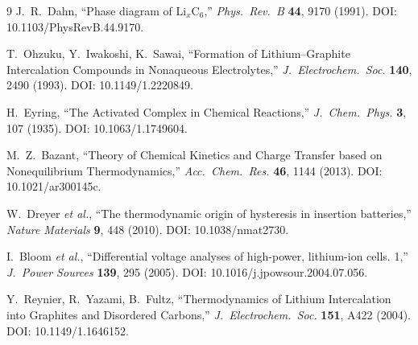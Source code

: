 \documentclass[11pt,a4paper]{article}
\begin{document}
\begin{thebibliography}{9}
J.~R.~Dahn, ``Phase diagram of $\mathrm{Li}_x\mathrm{C}_6$,''
\emph{Phys.\ Rev.\ B} \textbf{44}, 9170 (1991).
DOI: 10.1103/PhysRevB.44.9170.

T.~Ohzuku, Y.~Iwakoshi, K.~Sawai,
``Formation of Lithium--Graphite Intercalation Compounds in Nonaqueous Electrolytes,''
\emph{J.\ Electrochem.\ Soc.} \textbf{140}, 2490 (1993).
DOI: 10.1149/1.2220849.

H.~Eyring, ``The Activated Complex in Chemical Reactions,''
\emph{J.\ Chem.\ Phys.} \textbf{3}, 107 (1935).
DOI: 10.1063/1.1749604.

M.~Z.~Bazant,
``Theory of Chemical Kinetics and Charge Transfer based on Nonequilibrium Thermodynamics,''
\emph{Acc.\ Chem.\ Res.} \textbf{46}, 1144 (2013).
DOI: 10.1021/ar300145c.

W.~Dreyer \emph{et al.},
``The thermodynamic origin of hysteresis in insertion batteries,''
\emph{Nature Materials} \textbf{9}, 448 (2010).
DOI: 10.1038/nmat2730.

I.~Bloom \emph{et al.},
``Differential voltage analyses of high-power, lithium-ion cells. 1,''
\emph{J.\ Power Sources} \textbf{139}, 295 (2005).
DOI: 10.1016/j.jpowsour.2004.07.056.

Y.~Reynier, R.~Yazami, B.~Fultz,
``Thermodynamics of Lithium Intercalation into Graphites and Disordered Carbons,''
\emph{J.\ Electrochem.\ Soc.} \textbf{151}, A422 (2004).
DOI: 10.1149/1.1646152.
\end{thebibliography}
\end{document}
